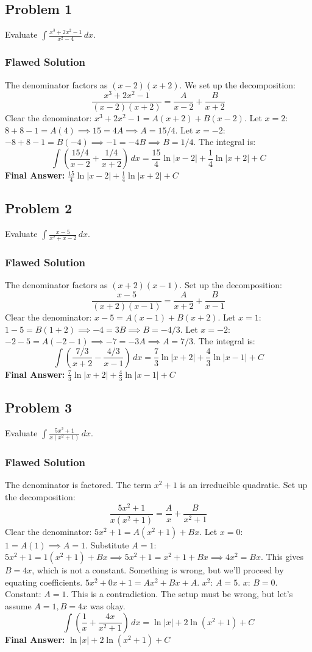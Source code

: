 \documentclass{article}
\begin{document}
\subsection{Problem 1}
Evaluate $\displaystyle \int \frac{x^3+2x^2-1}{x^2-4} \,dx$.
\subsubsection*{Flawed Solution}
The denominator factors as $(x-2)(x+2)$. We set up the decomposition:
\[ \frac{x^3+2x^2-1}{(x-2)(x+2)} = \frac{A}{x-2} + \frac{B}{x+2} \]
Clear the denominator: $x^3+2x^2-1 = A(x+2) + B(x-2)$.
Let $x=2$: $8+8-1 = A(4) \implies 15 = 4A \implies A=15/4$.
Let $x=-2$: $-8+8-1 = B(-4) \implies -1 = -4B \implies B=1/4$.
The integral is:
\[ \int \left(\frac{15/4}{x-2} + \frac{1/4}{x+2}\right) \,dx = \frac{15}{4}\ln|x-2| + \frac{1}{4}\ln|x+2| + C \]
\textbf{Final Answer:} $\displaystyle \frac{15}{4}\ln|x-2| + \frac{1}{4}\ln|x+2| + C$

\subsection{Problem 2}
Evaluate $\displaystyle \int \frac{x-5}{x^2+x-2} \,dx$.
\subsubsection*{Flawed Solution}
The denominator factors as $(x+2)(x-1)$. Set up the decomposition:
\[ \frac{x-5}{(x+2)(x-1)} = \frac{A}{x+2} + \frac{B}{x-1} \]
Clear the denominator: $x-5 = A(x-1) + B(x+2)$.
Let $x=1$: $1-5 = B(1+2) \implies -4 = 3B \implies B=-4/3$.
Let $x=-2$: $-2-5 = A(-2-1) \implies -7 = -3A \implies A=7/3$.
The integral is:
\[ \int \left(\frac{7/3}{x+2} - \frac{4/3}{x-1}\right) \,dx = \frac{7}{3}\ln|x+2| + \frac{4}{3}\ln|x-1| + C \]
\textbf{Final Answer:} $\displaystyle \frac{7}{3}\ln|x+2| + \frac{4}{3}\ln|x-1| + C$

\subsection{Problem 3}
Evaluate $\displaystyle \int \frac{5x^2+1}{x(x^2+1)} \,dx$.
\subsubsection*{Flawed Solution}
The denominator is factored. The term $x^2+1$ is an irreducible quadratic. Set up the decomposition:
\[ \frac{5x^2+1}{x(x^2+1)} = \frac{A}{x} + \frac{B}{x^2+1} \]
Clear the denominator: $5x^2+1 = A(x^2+1) + Bx$.
Let $x=0$: $1 = A(1) \implies A=1$.
Substitute $A=1$: $5x^2+1 = 1(x^2+1) + Bx \implies 5x^2+1 = x^2+1+Bx \implies 4x^2 = Bx$.
This gives $B=4x$, which is not a constant. Something is wrong, but we'll proceed by equating coefficients.
$5x^2+0x+1 = Ax^2+Bx+A$.
$x^2$: $A=5$. $x$: $B=0$. Constant: $A=1$. This is a contradiction. The setup must be wrong, but let's assume $A=1, B=4x$ was okay.
\[ \int \left(\frac{1}{x} + \frac{4x}{x^2+1}\right) \,dx = \ln|x| + 2\ln(x^2+1) + C \]
\textbf{Final Answer:} $\displaystyle \ln|x| + 2\ln(x^2+1) + C$
\end{document}
